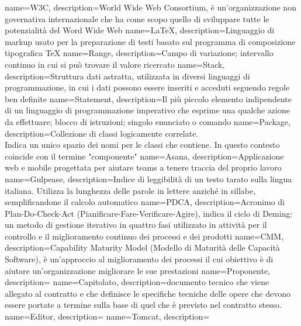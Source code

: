  {
	name=W3C,
	description={World Wide Web Consortium, è un'organizzazione non governativa internazionale che ha come scopo quello di
	sviluppare tutte le potenzialità del Word Wide Web}
}
 {
	name=LaTeX,
	description={Linguaggio di markup usato per la preparazione di testi basato sul programma di composizione tipografica
	TeX}
}
 {
	name=Range,
	description={Campo di variazione; intervallo continuo in cui si può trovare il valore ricercato}
}
 {
	name=Stack,
	description={Struttura dati astratta, utilizzata in diversi linguaggi di programmazione, in cui i dati possono essere
	inseriti e acceduti seguendo regole ben definite}
}
 {
	name=Statement,
	description={Il più piccolo elemento indipendente di un linguaggio di programmazione imperativo che esprime una qualche
	azione da effettuare; blocco di istruzioni; singolo enunciato o comando}
}
 {
	name=Package,
	description={Collezione di classi logicamente correlate. \\
	Indica un unico spazio dei nomi per le classi che contiene. In questo contesto coincide con il termine "componente"}
}
 {
	name=Asana,
	description={Applicazione web e mobile progettata per aiutare teams a tenere traccia del proprio lavoro}
}
 {
	name=Gulpease,
	description={Indice di leggibilità di un testo tarato sulla lingua italiana. Utilizza la lunghezza delle parole in
	lettere anziché in sillabe, semplificandone il calcolo automatico}
}
 {
	name=PDCA,
	description={Acronimo di Plan-Do-Check-Act (Pianificare-Fare-Verificare-Agire), indica il ciclo di Deming: un metodo di
	gestione iterativo in quattro fasi utilizzato in attività per il controllo e il miglioramento continuo dei processi e
	dei prodotti}
}
 {
	name=CMM,
	description={Capability Maturity Model (Modello di Maturità delle Capacità Software), è un'approccio al miglioramento
	dei processi il cui obiettivo è di aiutare un'organizzazione migliorare le sue prestazioni}
}
 {
	name=Proponente,
	description={}
}
 {
	name=Capitolato,
	description={documento tecnico che viene allegato al contratto e che definisce le specifiche tecniche delle opere che devono essere portate a termine sulla base di quel che è previsto nel contratto stesso.}
}
 {
	name=Editor,
	description={}
}
 {
	name=Tomcat,
	description={}
}
